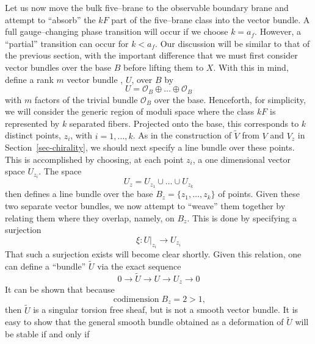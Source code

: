 \documentclass[a4paper,12pt]{article}
\numberwithin{equation}{section}
\def\cO{{\mathcal O}}
\theoremstyle{plain}
\begin{document}
Let us now move the bulk five--brane to the observable boundary brane and
attempt to ``absorb'' the $kF$ part of the five--brane class into the
vector bundle. A full gauge--changing phase transition will occur if we choose
$k=a_{f}$. However, a ``partial'' transition can occur for $k< a_{f}$. 
Our discussion will be similar to that of the previous section,
with the important difference that we must first consider vector bundles over
the base $B$ before lifting them to $X$. With this in mind, define a
rank $m$ vector bundle , $U$, over $B$ by
\begin{equation}
U= \cO_{B} \oplus \dots \oplus \cO_{B}
\label{eq:145}
\end{equation}
with $m$ factors of the trivial bundle $\cO_{B}$ over the base. Henceforth,
for simplicity, we will consider the generic region of moduli space where the
class $kF$ is represented by $k$ separated fibers. Projected onto the
base, this corresponds to $k$ distinct points, $z_{i}$, with
$i=1,\ldots,k$. As in the construction of $\widetilde{V}$ from $V$
and $V_{z}$ in Section~\ref{sec-chirality}, 
we should next specify a line bundle over these points. This
is accomplished by choosing, at each point $z_{i}$, a one dimensional vector
space $U_{z_{i}}$.
The space
\begin{equation}
U_{z}=U_{z_{1}}\cup \ldots \cup U_{z_{k}}
\label{eq:147}
\end{equation}
then defines a line bundle over the base
$B_{z}=\{ z_{1},\ldots,z_{k} \}$ of points. 
Given these two separate vector
bundles, we now attempt to ``weave'' them together by relating them where they
overlap, namely, on $B_{z}$. This is
done  by specifying a surjection
\begin{equation}
\xi:U|_{z_{i}} \rightarrow U_{z_{i}}
\label{eq:148}
\end{equation}
That such a surjection exists will become clear shortly. Given
this relation, one can define a ``bundle'' $\widetilde{U}$ via the
exact sequence
\begin{equation}
0 \rightarrow \widetilde{U} \rightarrow U \rightarrow U_{z}
\rightarrow 0
\label{eq:149}
\end{equation}
It can be shown that because
\begin{equation}
\operatorname{codimension}   B_{z}= 2 > 1,
\label{eq:150}
\end{equation}
then $\widetilde{U}$ is a singular torsion free sheaf, but is not a smooth 
vector bundle. It is easy to show that the general smooth bundle
obtained as a deformation of $\widetilde{U}$ will be stable if and only if
\end{document}
